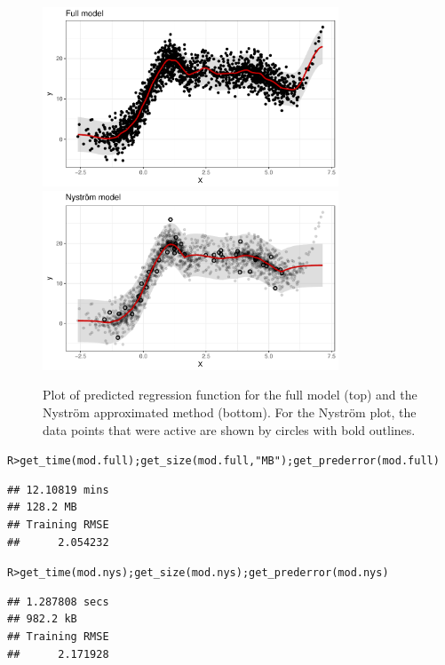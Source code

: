 \documentclass[showframe,11pt,twoside,openright]{report}\usepackage[]{graphicx}\usepackage[]{color}
\makeatletter
\newcommand{\hlstr}[1]{\textcolor[rgb]{0.063,0.58,0.627}{#1}}%
\newcommand{\hlstd}[1]{\textcolor[rgb]{0.196,0.196,0.196}{#1}}%
\newcommand{\hlkwd}[1]{\textcolor[rgb]{0.78,0.227,0.412}{#1}}%
\newenvironment{kframe}{%
 \def\at@end@of@kframe{}%
 \ifinner\ifhmode%
  \def\at@end@of@kframe{\end{minipage}}%
  \begin{minipage}{\columnwidth}%
 \fi\fi%
 \def\FrameCommand##1{\hskip\@totalleftmargin \hskip-\fboxsep
 \colorbox{shadecolor}{##1}\hskip-\fboxsep
     \hskip-\linewidth \hskip-\@totalleftmargin \hskip\columnwidth}%
 \MakeFramed {\advance\hsize-\width
   \@totalleftmargin\z@ \linewidth\hsize
   \@setminipage}}%
 {\par\unskip\endMakeFramed%
 \at@end@of@kframe}
\newenvironment{knitrout}{}{} %
\makeatother
\begin{document}
\begin{knitrout}
\color{fgcolor}\begin{figure}[t!]

{\centering \includegraphics[width=0.785\textwidth]{figure/04-nystrom_plot-1} 
\includegraphics[width=0.785\textwidth]{figure/04-nystrom_plot-2} 

}

\caption[Plot of predicted regression function for the full model (top) and the Nystr\"om approximated method (bottom)]{Plot of predicted regression function for the full model (top) and the Nystr\"om approximated method (bottom). For the Nystr\"om plot, the data points that were active are shown by circles with bold outlines.}\label{fig:nystrom.plot}
\end{figure}


\end{knitrout}
\begin{knitrout}
\color{fgcolor}\begin{kframe}
\begin{alltt}
\hlstd{R> }\hlkwd{get_time}\hlstd{(mod.full);} \hlkwd{get_size}\hlstd{(mod.full,} \hlstr{"MB"}\hlstd{);} \hlkwd{get_prederror}\hlstd{(mod.full)}
\end{alltt}
\begin{verbatim}
## 12.10819 mins
## 128.2 MB
## Training RMSE 
##      2.054232
\end{verbatim}
\begin{alltt}
\hlstd{R> }\hlkwd{get_time}\hlstd{(mod.nys);} \hlkwd{get_size}\hlstd{(mod.nys);} \hlkwd{get_prederror}\hlstd{(mod.nys)}
\end{alltt}
\begin{verbatim}
## 1.287808 secs
## 982.2 kB
## Training RMSE 
##      2.171928
\end{verbatim}
\end{kframe}
\end{knitrout}
\end{document}
